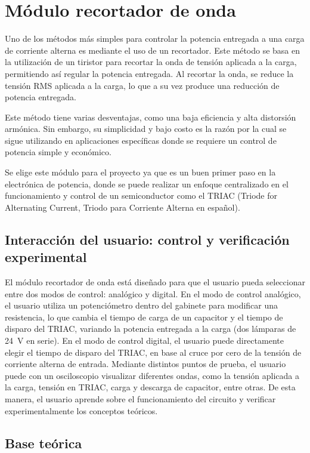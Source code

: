 \section{Módulo recortador de onda}

Uno de los métodos más simples para controlar la potencia entregada a una carga de corriente alterna es mediante el uso de un recortador. Este método se basa en la utilización de un tiristor para recortar la onda de tensión aplicada a la carga, permitiendo así regular la potencia entregada. Al recortar la onda, se reduce la tensión RMS aplicada a la carga, lo que a su vez produce una reducción de potencia entregada.

Este método tiene varias desventajas, como una baja eficiencia y alta distorsión armónica. Sin embargo, su simplicidad y bajo costo es la razón por la cual se sigue utilizando en aplicaciones específicas donde se requiere un control de potencia simple y económico.

Se elige este módulo para el proyecto ya que es un buen primer paso en la electrónica de potencia, donde se puede realizar un enfoque centralizado en el funcionamiento y control de un semiconductor como el TRIAC (Triode for Alternating Current, Triodo para Corriente Alterna en español).

\subsection{Interacción del usuario: control y verificación experimental}

El módulo recortador de onda está diseñado para que el usuario pueda seleccionar entre dos modos de control: analógico y digital. En el modo de control analógico, el usuario utiliza un potenciómetro dentro del gabinete para modificar una resistencia, lo que cambia el tiempo de carga de un capacitor y el tiempo de disparo del TRIAC, variando la potencia entregada a la carga (dos lámparas de \SI{24}{\volt} en serie). En el modo de control digital, el usuario puede directamente elegir el tiempo de disparo del TRIAC, en base al cruce por cero de la tensión de corriente alterna de entrada. Mediante distintos puntos de prueba, el usuario puede con un osciloscopio visualizar diferentes ondas, como la tensión aplicada a la carga, tensión en TRIAC, carga y descarga de capacitor, entre otras. De esta manera, el usuario aprende sobre el funcionamiento del circuito y verificar experimentalmente los conceptos teóricos.

\subsection{Base teórica}

